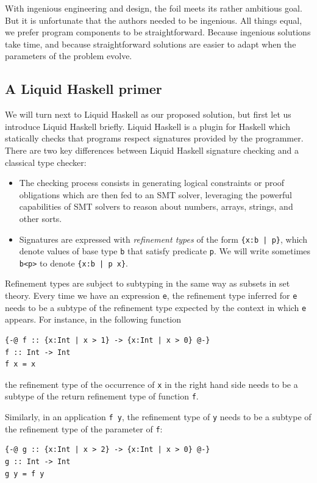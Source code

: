 \documentclass[sigconf]{acmart}
\newcommand{\tc}[1]{{\small\texttt{#1}}}
\begin{document}
With ingenious engineering and design, the foil meets its rather ambitious goal.
But it is unfortunate that the authors needed to be ingenious. All things equal,
we prefer program components to be straightforward. Because ingenious solutions
take time, and because straightforward solutions are easier to adapt when the
parameters of the problem evolve.


\subsection{A Liquid Haskell primer}

We will turn next to Liquid Haskell as our proposed solution, but first let us
introduce Liquid Haskell briefly.
Liquid Haskell is a
plugin for Haskell which statically checks that programs respect signatures
provided by the programmer. There are two key differences between Liquid Haskell
signature checking and a classical type checker:

\begin{itemize}
  \item The checking process consists in generating logical constraints or proof
        obligations which are then fed to an SMT solver, leveraging the powerful
        capabilities of SMT solvers to reason about numbers, arrays, strings,
        and other sorts.
  \item Signatures are expressed with \emph{refinement types} of the form
        \tc{\{x:b | p\}}, which denote values of base type \tc{b} that
        satisfy predicate \tc{p}. We will write sometimes \tc{b<p>} to denote
        \tc{\{x:b | p x\}}.
\end{itemize}

Refinement types are subject to subtyping in the same way as subsets in set
theory. Every time we have an expression \tc{e}, the refinement
type inferred for \tc{e} needs to be a subtype of the refinement type expected by
the context in which \tc{e} appears. For instance, in the following function
\begin{verbatim}
{-@ f :: {x:Int | x > 1} -> {x:Int | x > 0} @-}
f :: Int -> Int
f x = x
\end{verbatim}
the refinement type of the occurrence of \tc{x} in the right hand side
needs to be a subtype of the return refinement type of function \tc{f}.

Similarly, in an application \tc{f y}, the refinement type of \tc{y} needs
to be a subtype of the refinement type of the parameter of \tc{f}:
\begin{verbatim}
{-@ g :: {x:Int | x > 2} -> {x:Int | x > 0} @-}
g :: Int -> Int
g y = f y
\end{verbatim}
\end{document}
